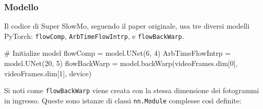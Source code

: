 \subsubsection*{Modello}

Il codice di Super SlowMo, seguendo il paper originale, usa tre diversi modelli PyTorch: 
\texttt{flowComp}, \texttt{ArbTimeFlowIntrp}, e \texttt{flowBackWarp}.

\begin{Python}
# Initialize model
flowComp = model.UNet(6, 4)
ArbTimeFlowIntrp = model.UNet(20, 5)
flowBackWarp = model.backWarp(videoFrames.dim[0], videoFrames.dim[1], device)
\end{Python}

Si noti come \texttt{flowBackWarp} viene creata con la stessa dimensione dei fotogrammi in 
ingresso. Queste sono istanze di classi \texttt{nn.Module} complesse così definite:

